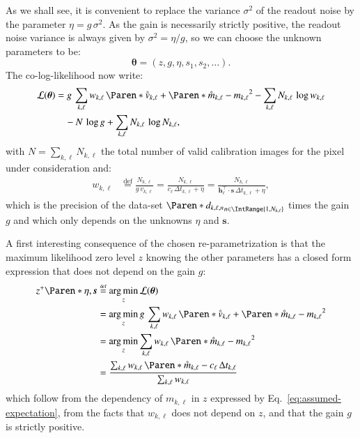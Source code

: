 \documentclass{aa}
\DeclareMathOperator*{\argmin}{arg\,min}
\newcommand*{\bydef}{\stackrel{{\scriptscriptstyle \text{def}}}{=}}
\newcommand*{\empirical}[1]{\mathring{#1}}
\newcommand*{\V}[1]{\boldsymbol{#1}}   %
\newcommand*{\TransposeLetter}{\top}
\newcommand*{\T}{^{\TransposeLetter}}
\newcommand*{\MC}[1]{\mathcal{#1}}
\newcommand*{\lkl}{\MC{L}}
\begin{document}
As we shall see, it is convenient to replace the variance $\sigma^2$ of the
readout noise  by the parameter $\eta = g\,\sigma^2$.  As the gain is
necessarily strictly positive, the readout noise variance is always given by
$\sigma^2 = \eta/g$, so we can choose the unknown parameters to be:
\begin{equation}
  \label{eq:unknowns}
  \V\theta = (z, g, \eta, s_{1}, s_{2}, \ldots).
\end{equation}
The co-log-likelihood now write:
\begin{align}
  \lkl(\V\theta)
  &= g\,\sum_{k,\ell} w_{k,\ell}\,\Paren*{
      \empirical{v}_{k,\ell}
      + \Paren*{\empirical{m}_{k,\ell} - m_{k,\ell}}^2
  } - \sum_{k,\ell} N_{k,\ell}\,\log w_{k,\ell}\notag\\
  &\quad - N\,\log g + \sum_{k,\ell} N_{k,\ell}\,\log N_{k,\ell},
  \label{eq:rewritten-cologlikelihood}
\end{align}
with $N = \sum_{k,\ell} N_{k,\ell}$ the total number of valid calibration images for the
pixel under consideration and:
\begin{align}
  \label{eq:reduced-precision-over-gain}
  w_{k,\ell} %
  &\bydef \frac{N_{k,\ell}}{g\,v_{k,\ell}}
  = \frac{N_{k,\ell}}{c_{\ell}\,\Delta t_{k,\ell} + \eta}
  = \frac{N_{k,\ell}}{\V h_\ell\T⋅\V s\,\Delta t_{k,\ell} + \eta},
\end{align}
which is the precision of the data-set
$\Paren*{d_{k,\ell,n}}_{n\in\IntRange{1,N_{k,\ell}}}$ times the gain $g$ and
which only depends on the unknowns $\eta$ and $\V s$.

A first interesting consequence of the chosen re-parametrization is that the
maximum likelihood zero level $z$ knowing the other parameters has a closed form
expression that does not depend on the gain $g$:
\begin{align}
  z^+\Paren*{\eta, \V s}
  &\bydef \argmin_{z} \lkl(\V\theta) \notag\\
  &= \argmin_{z} g\,\sum_{k,\ell} w_{k,\ell}\,\Paren*{
      \empirical{v}_{k,\ell}
      + \Paren*{\empirical{m}_{k,\ell} - m_{k,\ell}}^2
  } \notag \\
  &= \argmin_{z} \sum_{k,\ell}
     w_{k,\ell}\,\Paren*{\empirical{m}_{k,\ell} - m_{k,\ell}}^2 \notag \\
  &= \frac{
      \sum_{k,\ell} w_{k,\ell}\,
      \Paren*{\empirical{m}_{k,\ell} - c_\ell\,\Delta t_{k,\ell}}
    }{
      \sum_{k,\ell} w_{k,\ell}
    }
  \label{eq:marginal-bias}
\end{align}
which follow from the dependency of $m_{k,\ell}$ in $z$ expressed by
Eq.~\eqref{eq:assumed-expectation}, from the facts that $w_{k,\ell}$ does not
depend on $z$, and that the gain $g$ is strictly positive.
\end{document}
